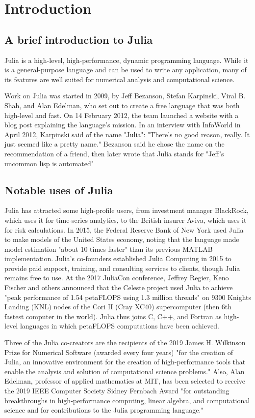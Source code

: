\documentclass[a4paper,12pt,openany]{book}
\begin{document}
\chapter{Introduction}
\section{A brief introduction to Julia}

Julia is a high-level, high-performance, dynamic programming language. While it is a general-purpose language and can be used to write any application, many of its features are well suited for numerical analysis and computational science.

Work on Julia was started in 2009, by Jeff Bezanson, Stefan Karpinski, Viral B. Shah, and Alan Edelman, who set out to create a free language that was both high-level and fast. On 14 February 2012, the team launched a website with a blog post explaining the language's mission. In an interview with InfoWorld in April 2012, Karpinski said of the name "Julia": "There's no good reason, really. It just seemed like a pretty name." Bezanson said he chose the name on the recommendation of a friend, then later wrote that Julia stands for "Jeff’s uncommon lisp is automated"

\section{Notable uses of Julia}
Julia has attracted some high-profile users, from investment manager BlackRock, which uses it for time-series analytics, to the British insurer Aviva, which uses it for risk calculations. In 2015, the Federal Reserve Bank of New York used Julia to make models of the United States economy, noting that the language made model estimation "about 10 times faster" than its previous MATLAB implementation. Julia's co-founders established Julia Computing in 2015 to provide paid support, training, and consulting services to clients, though Julia remains free to use. At the 2017 JuliaCon conference, Jeffrey Regier, Keno Fischer and others announced that the Celeste project used Julia to achieve "peak performance of 1.54 petaFLOPS using 1.3 million threads" on 9300 Knights Landing (KNL) nodes of the Cori II (Cray XC40) supercomputer (then 6th fastest computer in the world). Julia thus joins C, C++, and Fortran as high-level languages in which petaFLOPS computations have been achieved.


Three of the Julia co-creators are the recipients of the 2019 James H. Wilkinson Prize for Numerical Software (awarded every four years) "for the creation of Julia, an innovative environment for the creation of high-performance tools that enable the analysis and solution of computational science problems." Also, Alan Edelman, professor of applied mathematics at MIT, has been selected to receive the 2019 IEEE Computer Society Sidney Fernbach Award "for outstanding breakthroughs in high-performance computing, linear algebra, and computational science and for contributions to the Julia programming language."
\end{document}
